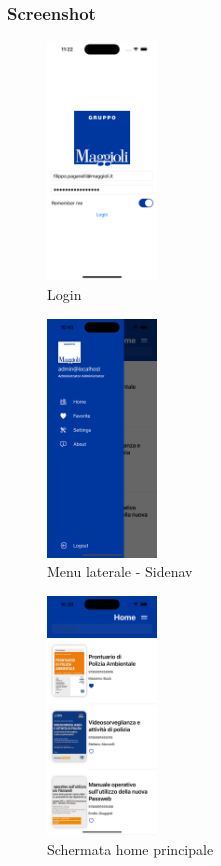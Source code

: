 \subsubsection*{Screenshot}
\begin{multicols}{3}
    \begin{figure}[H]
        \centering
        \includegraphics[width=0.26\textwidth]{img/login_ios.png}
        \caption{Login}
        \label{login-ios}
    \end{figure}

    \begin{figure}[H]
        \centering
        \includegraphics[width=0.26\textwidth]{img/sidenav_ios.png}
        \caption{Menu laterale - Sidenav}
        \label{sidenav-ios}
    \end{figure}
    
    \begin{figure}[H]
        \centering
        \includegraphics[width=0.26\textwidth]{img/home_ios.png}
        \caption{Schermata home principale}
        \label{home-ios}
    \end{figure}
    

\end{multicols}
